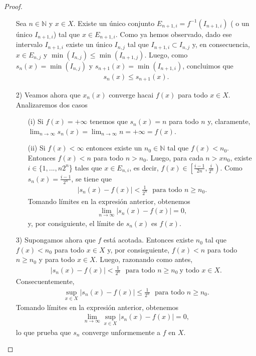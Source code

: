 \begin{proof}
\begin{enumerate}
    \newline
    Sea $n \in \mathbb{N}$ y $x \in X$. Existe un único conjunto $E_{n+1,i} = f^{-1}(I_{n+1,i})$ ( o un único $I_{n+1,i}$) tal que $x \in E_{n+1,i}$. Como ya hemos observado, dado ese intervalo $I_{n+1,i}$ existe un único $I_{n,j}$ tal que $I_{n+1,i} \subset I_{n,j}$ y, en consecuencia, $x \in E_{n,j}$ y $\min(I_{n,j}) \leq \min(I_{n+1,j})$. Luego, como $s_n(x) = \min(I_{n,j})$ y $s_{n+1}(x) = \min(I_{n+1,i})$, concluimos que
    \begin{align*}
        s_n(x) \leq s_{n+1}(x).
    \end{align*}
    \item[2)] Veamos ahora que $x_n(x)$ converge hacai $f(x)$ para todo $x \in X$. Analizaremos dos casos
    \begin{enumerate}
        \item[(i)] Si $f(x) = +\infty$ tenemos que $s_n(x) = n$ para todo $n$ y, claramente, $\lim_{n \to \infty}{s_n(x)} = \lim_{n \to \infty}{n} = +\infty =  f(x)$.
        \item[(ii)] Si $f(x) < \infty$ entonces existe un $n_0 \in \mathbb{N}$ tal que $f(x) < n_0$. Entonces $f(x) < n$ para todo $n > n_0$. Luego, para cada $n >x n_0$, existe $i \in \{ 1,...,n2^n$\} tales que $x \in E_{n,i}$, es decir, $f(x) \in \left[ \frac{i-1}{2n}, \frac{i}{2^n} \right)$. Como $s_n(x) = \frac{i-1}{2^n}$, se tiene que
        \begin{align*}
            |s_n(x) - f(x)| < \frac{1}{2^n} \ \ \ \text{para todo } n \ge n_0.
        \end{align*}
        Tomando límites en la expresión anterior, obtenemos
        \begin{align*}
            \lim_{n \to \infty}{|s_n(x) - f(x)|} = 0,
        \end{align*}
        y, por consiguiente, el límite de $s_n(x)$ es $f(x)$.
    \end{enumerate}
    \item[3)] Supongamos ahora que $f$ está acotada. Entonces existe $n_0$ tal que $f(x) < n_0$ para todo $x \in X$ y, por consisguiente, $f(x) < n$ para todo $n \ge n_0$ y para todo $x \in X$. Luego, razonando como antes,
    \begin{align*}
        |s_n(x) - f(x)| < \frac{1}{2^n} \ \ \ \text{para todo } n \ge n_0 \ \text{y todo } x \in X.
    \end{align*}
    Consecuentemente,
    \begin{align*}
        \sup_{x \in X}{|s_n(x) - f(x)|} \leq \frac{1}{2^n} \ \ \ \text{para todo } n \ge n_0.
    \end{align*}
    Tomando límites en la expresión anterior, obtenemos
        \begin{align*}
            \lim_{n \to \infty}{\sup_{x \in X}{|s_n(x) - f(x)|}} = 0,
        \end{align*}
        lo que prueba que $s_n$ converge unformemente a $f$ en $X$.
\end{enumerate}
\end{proof}

